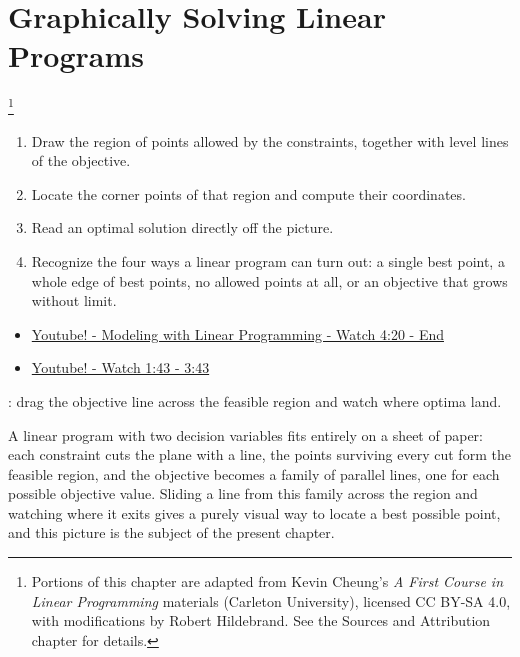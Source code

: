 \chapter{Graphically Solving Linear Programs}\footnote{Portions of this chapter are adapted from Kevin Cheung's \emph{A First Course in Linear Programming} materials (Carleton University), licensed CC BY-SA 4.0, with modifications by Robert Hildebrand. See the Sources and Attribution chapter for details.}

\begin{outcome}
\begin{enumerate}
\item[A.] Draw the region of points allowed by the constraints, together with level lines of the objective.
\item[B.] Locate the corner points of that region and compute their coordinates.
\item[C.] Read an optimal solution directly off the picture.
\item[D.] Recognize the four ways a linear program can turn out: a single best point, a whole edge of best points, no allowed points at all, or an objective that grows without limit.
\end{enumerate}
\end{outcome}
\begin{resource}
\begin{itemize}
\item \href{https://www.youtube.com/watch?v=K7TL5NMlKIk&ab_channel=Dr.TreforBazett}{Youtube! - Modeling with Linear Programming - Watch 4:20 - End}
\item \href{https://www.youtube.com/watch?v=E72DWgKP_1Y&t=1014s&ab_channel=TomS}{Youtube! - Watch 1:43 - 3:43}
\end{itemize}
\end{resource}

\begin{tryit}
: drag the objective line across the feasible region and watch where optima land.
\end{tryit}


A linear program with two decision variables fits entirely on a sheet of paper: each constraint cuts the plane with a line, the points surviving every cut form the feasible region, and the objective becomes a family of parallel lines, one for each possible objective value. Sliding a line from this family across the region and watching where it exits gives a purely visual way to locate a best possible point, and this picture is the subject of the present chapter.

